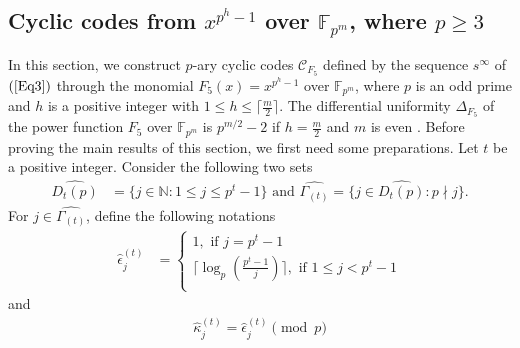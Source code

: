 \documentclass[pdflatex,sn-mathphys-num]{sn-jnl}%
\theoremstyle{thmstyleone}%
\theoremstyle{thmstyletwo}%
\theoremstyle{thmstylethree}%
\begin{document}
    \subsection{Cyclic codes from $x^{p^h-1}$ over $\mathbb{F}_{p^{m}}$, where $p\geq 3$}
    In this section, we construct $p$-ary cyclic codes $\mathcal{C}_{F_{5}}$ defined by the sequence $s^{\infty}$ of $(\ref{Eq3})$ through the monomial $F_{5}(x)=x^{p^h-1}$ over $\mathbb{F}_{p^m}$, where $p$ is an odd prime and $h$ is a positive integer with $1\leq h\leq\lceil\frac{m}{2}\rceil$. The differential uniformity $\Delta_{F_{5}}$ of the power function $F_{5}$ over $\mathbb{F}_{p^m}$ is $p^{m/2}-2$ if $h=\frac{m}{2}$ and $m$ is even \cite{Uniform5}.
    \vskip 1pt
    Before proving the main results of this section, we first need some preparations. Let $t$ be a positive integer. Consider the following two sets
     \begin{align}\label{Eq10}
         \widehat{D_{t}(p)} &= \{j\in\mathbb{N}:1\leq j\leq p^{t}-1\}              
        \text{ and } 
         \widehat{\Gamma_{(t)}}= \{j\in \widehat{D_{t}(p)}:p\nmid j\}.  
     \end{align}
     For $j\in\widehat{\Gamma_{(t)}}$, define the following notations
     \begin{align}\label{Eq11}
         \hat{\epsilon}_{j}^{(t)} &= \begin{cases}
             1,\text{ if }j=p^t-1 \\
             \Big\lceil\operatorname{log}_{p}\left(\frac{p^t-1}{j}\right)\Big\rceil,\text{ if }1\leq j<p^t-1 \\
         \end{cases} 
     \end{align}
     and 
     \begin{align*}
         \hat{\kappa}_{j}^{(t)}= \hat{\epsilon}_{j}^{(t)}\pmod{p}
     \end{align*}
\end{document}
